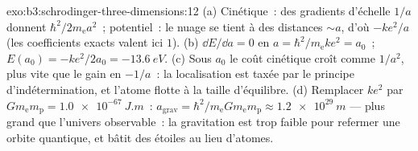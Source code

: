 \begin{solution}{exo:b3:schrodinger-three-dimensions:12}
(a) Cinétique~: des gradients d'échelle $1/a$ donnent $\hbar^2/2m_{\text{e}}
a^2$~; potentiel~: le nuage se tient à des distances $\sim a$, d'où
$-ke^2/a$ (les coefficients exacts valent ici $1$). (b) $\dd E/\dd
a = 0$ en $a = \hbar^2/m_{\text{e}}ke^2 = a_0$~; $E(a_0) =
-ke^2/2a_0 = \qty{-13.6}{eV}$. (c) Sous $a_0$ le coût cinétique croît
comme $1/a^2$, plus vite que le gain en $-1/a$~: la localisation est
taxée par le principe d'indétermination, et l'atome flotte à la taille
d'équilibre. (d) Remplacer $ke^2$ par $Gm_{\text{e}}m_{\text{p}} =
\qty{1.0e-67}{J.m}$~: $a_{\text{grav}} = \hbar^2/m_{\text{e}}G
m_{\text{e}}m_{\text{p}} \approx \qty{1.2e29}{m}$ --- plus grand que
l'univers observable~: la gravitation est trop faible pour refermer une
orbite quantique, et bâtit des étoiles au lieu d'atomes.
\end{solution}

